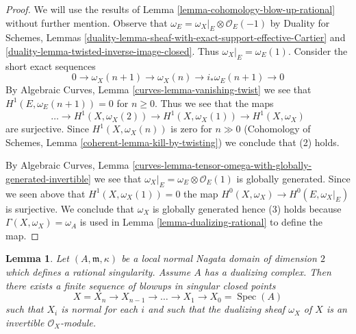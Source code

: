 \documentclass{stacks-project}
\theoremstyle{plain}
\newtheorem{lemma}[subsection]{Lemma}
\theoremstyle{definition}
\theoremstyle{remark}
\numberwithin{equation}{subsection}
\def\Spec{\mathop{\mathrm{Spec}}}
\begin{document}
\begin{proof}
We will use the results of Lemma \ref{lemma-cohomology-blow-up-rational}
without further mention. Observe that
$\omega_E = \omega_X|_E \otimes \mathcal{O}_E(-1)$
by Duality for Schemes, Lemmas
\ref{duality-lemma-sheaf-with-exact-support-effective-Cartier} and
\ref{duality-lemma-twisted-inverse-image-closed}. Thus
$\omega_X|_E = \omega_E(1)$. Consider the short exact sequences
$$
0 \to \omega_X(n + 1) \to \omega_X(n) \to i_*\omega_E(n + 1) \to 0
$$
By Algebraic Curves, Lemma \ref{curves-lemma-vanishing-twist}
we see that $H^1(E, \omega_E(n + 1)) = 0$ for $n \geq 0$.
Thus we see that the maps
$$
\ldots \to H^1(X, \omega_X(2)) \to H^1(X, \omega_X(1)) \to H^1(X, \omega_X)
$$
are surjective. Since $H^1(X, \omega_X(n))$ is zero for $n \gg 0$
(Cohomology of Schemes, Lemma \ref{coherent-lemma-kill-by-twisting})
we conclude that (2) holds.

\medskip\noindent
By Algebraic Curves, Lemma
\ref{curves-lemma-tensor-omega-with-globally-generated-invertible}
we see that $\omega_X|_E = \omega_E \otimes \mathcal{O}_E(1)$
is globally generated. Since we seen above that
$H^1(X, \omega_X(1)) = 0$ the map $H^0(X, \omega_X) \to H^0(E, \omega_X|_E)$
is surjective. We conclude that $\omega_X$ is globally generated
hence (3) holds because $\Gamma(X, \omega_X) = \omega_A$ is used
in Lemma \ref{lemma-dualizing-rational} to define the map.
\end{proof}

\begin{lemma}
\label{lemma-rational-to-gorenstein}
Let $(A, \mathfrak m, \kappa)$ be a local normal Nagata domain of
dimension $2$ which defines a rational singularity. Assume $A$ has
a dualizing complex. Then there exists a finite sequence of blowups in
singular closed points
$$
X = X_n \to X_{n - 1} \to \ldots \to X_1 \to X_0 = \Spec(A)
$$
such that $X_i$ is normal for each $i$ and such that
the dualizing sheaf $\omega_X$ of $X$ is an invertible
$\mathcal{O}_X$-module.
\end{lemma}
\end{document}
